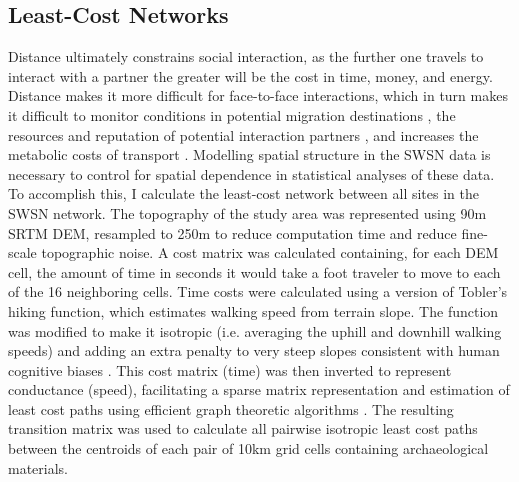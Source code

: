 \documentclass[11pt]{iopart}
\begin{document}
\subsection*{Least-Cost Networks}
Distance ultimately constrains social interaction, as the further one travels to interact with a partner the greater will be the cost in time, money, and energy. Distance makes it more difficult for face-to-face interactions, which in turn makes it difficult to monitor conditions in potential migration destinations \parencite{Anderies2011a}, the resources and reputation of potential interaction partners \parencite{Fafchamps2007}, and increases the metabolic costs of transport \parencite{Drennan1984}. Modelling spatial structure in the SWSN data is necessary to control for spatial dependence in statistical analyses of these data. To accomplish this, I calculate the least-cost network between all sites in the SWSN network. The topography of the study area was represented using 90m SRTM DEM, resampled to 250m to reduce computation time and reduce fine-scale topographic noise. A cost matrix was calculated containing, for each DEM cell, the amount of time in seconds it would take a foot traveler to move to each of the 16 neighboring cells. Time costs were calculated using a version of Tobler's hiking function, which estimates walking speed from terrain slope. The function was modified to make it isotropic (i.e. averaging the uphill and downhill walking speeds) and adding an extra penalty to very steep slopes consistent with human cognitive biases \parencite{Pingel2010}. This cost matrix (time) was then inverted to represent conductance (speed), facilitating a sparse matrix representation and estimation of least cost paths using efficient graph theoretic algorithms \parencite{Etten2014}. The resulting transition matrix was used to calculate all pairwise isotropic least cost paths between the centroids of each pair of 10km grid cells containing archaeological materials. 
\end{document}
